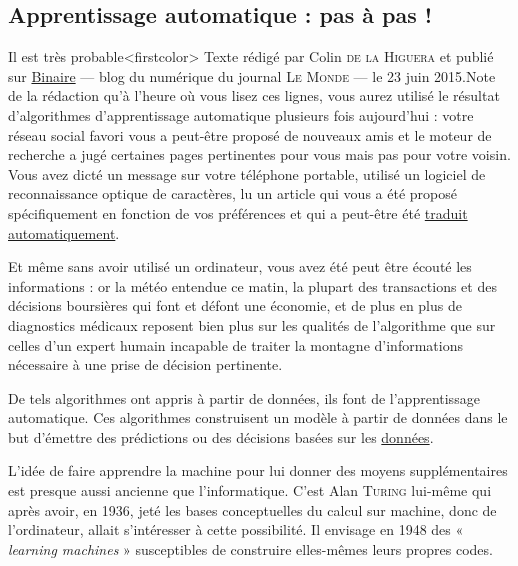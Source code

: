

\subsection[Apprentissage automatique]{Apprentissage automatique : pas à pas !}
\label{sub:III.4.2}


Il est très probable\caution[t]<firstcolor>{%
\upshape Texte rédigé par Colin \textsc{de la Higuera} et publié sur \href{https://www.lemonde.fr/blog/binaire/2015/06/23/pasapas/}{Binaire} --- blog du numérique du journal \textsc{Le Monde} --- le 23 juin 2015.\parnotes}{\upshape Note de la rédaction}
 qu’à l’heure où vous lisez ces lignes, vous aurez utilisé le résultat d’algorithmes d’apprentissage automatique plusieurs fois aujourd’hui : votre réseau social favori vous a peut-être proposé de nouveaux amis et le moteur de recherche a jugé certaines pages pertinentes pour vous mais pas pour votre voisin. Vous avez dicté un message sur votre téléphone portable, utilisé un logiciel de reconnaissance optique de caractères, lu un article qui vous a été proposé spécifiquement en fonction de vos préférences et qui a peut-être été \href{https://interstices.info/la-traduction-automatique-statistique-comment-ca-marche/}{traduit automatiquement}.

Et même sans avoir utilisé un ordinateur, vous avez été peut être écouté les informations : or la météo entendue ce matin, la plupart des transactions et des décisions boursières qui font et défont une économie, et de plus en plus de diagnostics médicaux reposent bien plus sur les qualités de l’algorithme que sur celles d’un expert humain incapable de traiter la montagne d’informations nécessaire à une prise de décision pertinente.

De tels algorithmes ont appris à partir de données, ils font de l’apprentissage automatique. Ces algorithmes construisent un modèle à partir de données dans le but d’émettre des prédictions ou des décisions basées sur les \href{https://en.wikipedia.org/wiki/Machine_learning}{données}.


L’idée de faire apprendre la machine pour lui donner des moyens supplémentaires est presque aussi ancienne que l’informatique. C’est Alan \textsc{Turing} lui-même qui après avoir, en 1936, jeté les bases conceptuelles du calcul sur machine, donc de l’ordinateur, allait s’intéresser à cette possibilité. Il envisage en 1948 des « \textit{learning machines} » susceptibles de construire elles-mêmes leurs propres codes.

